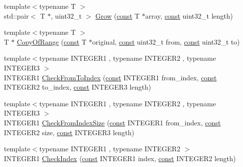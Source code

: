 \begin{DoxyCompactItemize}
\item 
{\footnotesize template$<$typename T $>$ }\\std\+::pair$<$ T $\ast$, uint32\+\_\+t $>$ \mbox{\hyperlink{namespacelucene_1_1core_1_1util_1_1arrayutil_a543120187e226762f0a5d9965188ba8c}{Grow}} (\mbox{\hyperlink{ZlibCrc32_8h_a2c212835823e3c54a8ab6d95c652660e}{const}} T $\ast$array, \mbox{\hyperlink{ZlibCrc32_8h_a2c212835823e3c54a8ab6d95c652660e}{const}} uint32\+\_\+t length)
\item 
{\footnotesize template$<$typename T $>$ }\\T $\ast$ \mbox{\hyperlink{namespacelucene_1_1core_1_1util_1_1arrayutil_a107a721d94f4e31167dc49e3b07ac859}{Copy\+Of\+Range}} (\mbox{\hyperlink{ZlibCrc32_8h_a2c212835823e3c54a8ab6d95c652660e}{const}} T $\ast$original, \mbox{\hyperlink{ZlibCrc32_8h_a2c212835823e3c54a8ab6d95c652660e}{const}} uint32\+\_\+t from, \mbox{\hyperlink{ZlibCrc32_8h_a2c212835823e3c54a8ab6d95c652660e}{const}} uint32\+\_\+t to)
\item 
{\footnotesize template$<$typename I\+N\+T\+E\+G\+E\+R1 , typename I\+N\+T\+E\+G\+E\+R2 , typename I\+N\+T\+E\+G\+E\+R3 $>$ }\\I\+N\+T\+E\+G\+E\+R1 \mbox{\hyperlink{namespacelucene_1_1core_1_1util_1_1arrayutil_a18335a8c7e46732362ebbf7dedb060f9}{Check\+From\+To\+Index}} (\mbox{\hyperlink{ZlibCrc32_8h_a2c212835823e3c54a8ab6d95c652660e}{const}} I\+N\+T\+E\+G\+E\+R1 from\+\_\+index, \mbox{\hyperlink{ZlibCrc32_8h_a2c212835823e3c54a8ab6d95c652660e}{const}} I\+N\+T\+E\+G\+E\+R2 to\+\_\+index, \mbox{\hyperlink{ZlibCrc32_8h_a2c212835823e3c54a8ab6d95c652660e}{const}} I\+N\+T\+E\+G\+E\+R3 length)
\item 
{\footnotesize template$<$typename I\+N\+T\+E\+G\+E\+R1 , typename I\+N\+T\+E\+G\+E\+R2 , typename I\+N\+T\+E\+G\+E\+R3 $>$ }\\I\+N\+T\+E\+G\+E\+R1 \mbox{\hyperlink{namespacelucene_1_1core_1_1util_1_1arrayutil_ae747b6a73432eb1047e4bdde1b7ccc4a}{Check\+From\+Index\+Size}} (\mbox{\hyperlink{ZlibCrc32_8h_a2c212835823e3c54a8ab6d95c652660e}{const}} I\+N\+T\+E\+G\+E\+R1 from\+\_\+index, \mbox{\hyperlink{ZlibCrc32_8h_a2c212835823e3c54a8ab6d95c652660e}{const}} I\+N\+T\+E\+G\+E\+R2 size, \mbox{\hyperlink{ZlibCrc32_8h_a2c212835823e3c54a8ab6d95c652660e}{const}} I\+N\+T\+E\+G\+E\+R3 length)
\item 
{\footnotesize template$<$typename I\+N\+T\+E\+G\+E\+R1 , typename I\+N\+T\+E\+G\+E\+R2 $>$ }\\I\+N\+T\+E\+G\+E\+R1 \mbox{\hyperlink{namespacelucene_1_1core_1_1util_1_1arrayutil_a0cd5572d14e7d2e96ae4a5d055267610}{Check\+Index}} (\mbox{\hyperlink{ZlibCrc32_8h_a2c212835823e3c54a8ab6d95c652660e}{const}} I\+N\+T\+E\+G\+E\+R1 index, \mbox{\hyperlink{ZlibCrc32_8h_a2c212835823e3c54a8ab6d95c652660e}{const}} I\+N\+T\+E\+G\+E\+R2 length)
\end{DoxyCompactItemize}


